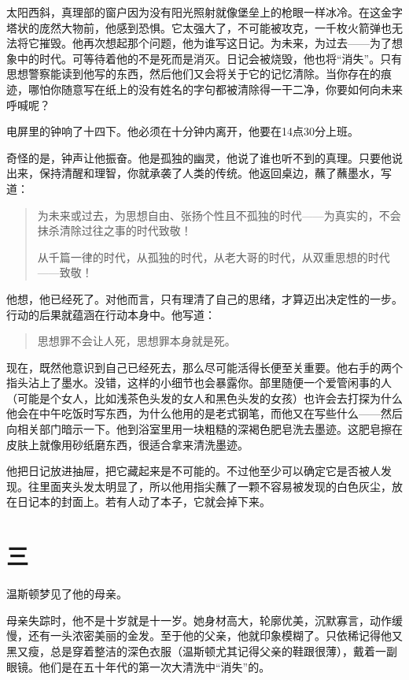 太阳西斜，真理部的窗户因为没有阳光照射就像堡垒上的枪眼一样冰冷。在这金字塔状的庞然大物前，他感到恐惧。它太强大了，不可能被攻克，一千枚火箭弹也无法将它摧毁。他再次想起那个问题，他为谁写这日记。为未来，为过去——为了想象中的时代。可等待着他的不是死而是消灭。日记会被烧毁，他也将``消失''。只有思想警察能读到他写的东西，然后他们又会将关于它的记忆清除。当你存在的痕迹，哪怕你随意写在纸上的没有姓名的字句都被清除得一干二净，你要如何向未来呼喊呢？

电屏里的钟响了十四下。他必须在十分钟内离开，他要在14点30分上班。

奇怪的是，钟声让他振奋。他是孤独的幽灵，他说了谁也听不到的真理。只要他说出来，保持清醒和理智，你就承袭了人类的传统。他返回桌边，蘸了蘸墨水，写道：

\begin{quotation}
为未来或过去，为思想自由、张扬个性且不孤独的时代——为真实的，不会抹杀清除过往之事的时代致敬！\par
从千篇一律的时代，从孤独的时代，从老大哥的时代，从双重思想的时代——致敬！
\end{quotation}

他想，他已经死了。对他而言，只有理清了自己的思绪，才算迈出决定性的一步。行动的后果就蕴涵在行动本身中。他写道：

\begin{quotation}
思想罪不会让人死，思想罪本身就是死。
\end{quotation}

现在，既然他意识到自己已经死去，那么尽可能活得长便至关重要。他右手的两个指头沾上了墨水。没错，这样的小细节也会暴露你。部里随便一个爱管闲事的人（可能是个女人，比如浅茶色头发的女人和黑色头发的女孩）也许会去打探为什么他会在中午吃饭时写东西，为什么他用的是老式钢笔，而他又在写些什么——然后向相关部门暗示一下。他到浴室里用一块粗糙的深褐色肥皂洗去墨迹。这肥皂擦在皮肤上就像用砂纸磨东西，很适合拿来清洗墨迹。

他把日记放进抽屉，把它藏起来是不可能的。不过他至少可以确定它是否被人发现。往里面夹头发太明显了，所以他用指尖蘸了一颗不容易被发现的白色灰尘，放在日记本的封面上。若有人动了本子，它就会掉下来。

\section*{三}\label{ux4e09}

温斯顿梦见了他的母亲。

母亲失踪时，他不是十岁就是十一岁。她身材高大，轮廓优美，沉默寡言，动作缓慢，还有一头浓密美丽的金发。至于他的父亲，他就印象模糊了。只依稀记得他又黑又瘦，总是穿着整洁的深色衣服（温斯顿尤其记得父亲的鞋跟很薄），戴着一副眼镜。他们是在五十年代的第一次大清洗中``消失''的。

